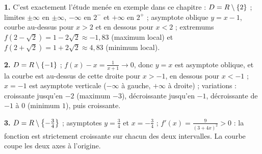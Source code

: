 \begin{corrige}[annales]
\textbf{1.} C'est exactement l'étude menée en exemple dans ce chapitre :
$D = R\setminus\{2\}$ ; limites $\pm\infty$ en $\pm\infty$, $-\infty$ en
$2^{-}$ et $+\infty$ en $2^{+}$ ; asymptote oblique $y = x-1$, courbe
au-dessus pour $x>2$ et en dessous pour $x<2$ ; extremums
$f(2-\sqrt2) = 1-2\sqrt2 \approx -1{,}83$ (maximum local) et
$f(2+\sqrt2) = 1+2\sqrt2 \approx 4{,}83$ (minimum local).

\textbf{2.} $D = R\setminus\{-1\}$ ; $f(x)-x = \frac{1}{x+1} \to 0$, donc
$y = x$ est asymptote oblique, et la courbe est au-dessus de cette droite
pour $x>-1$, en dessous pour $x<-1$ ; $x = -1$ est asymptote verticale
($-\infty$ à gauche, $+\infty$ à droite) ; variations : croissante jusqu'en
$-2$ (maximum $-3$), décroissante jusqu'en $-1$, décroissante de $-1$ à $0$
(minimum $1$), puis croissante.

\textbf{3.} $D = R\setminus\left\{-\frac34\right\}$ ; asymptotes
$y = \frac34$ et $x = -\frac34$ ; $f'(x) = \frac{9}{(3+4x)^{2}} > 0$ : la
fonction est strictement croissante sur chacun des deux intervalles. La
courbe coupe les deux axes à l'origine.
\end{corrige}

